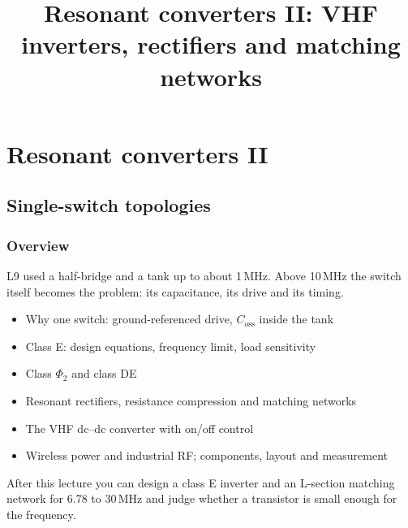 \title[Resonant converters II]{Resonant converters II: VHF inverters, rectifiers and matching networks}
\section{Resonant converters II}

\begin{frame}[plain]
	\titlepage
\end{frame}

\subsection{Single-switch topologies}

\begin{frame}
	\frametitle{Overview}
	L9 used a half-bridge and a tank up to about 1\,MHz. Above 10\,MHz the switch itself becomes the problem: its capacitance, its drive and its timing.
	\begin{itemize}
		\item Why one switch: ground-referenced drive, $C_\mathrm{oss}$ inside the tank
		\item Class E: design equations, frequency limit, load sensitivity
		\item Class $\Phi_2$ and class DE
		\item Resonant rectifiers, resistance compression and matching networks
		\item The VHF dc--dc converter with on/off control
		\item Wireless power and industrial RF; components, layout and measurement
	\end{itemize}
	After this lecture you can design a class E inverter and an L-section matching network for 6.78 to 30\,MHz and judge whether a transistor is small enough for the frequency.
\end{frame}

